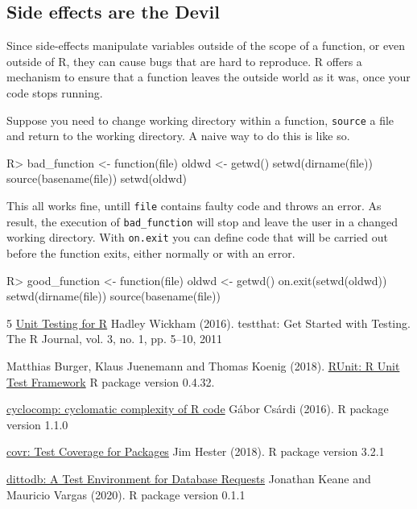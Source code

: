 \documentclass[11pt]{article}
\newcommand{\code}[1]{\texttt{#1}}
\let\oldmarginpar\marginpar
\renewcommand{\marginpar}[1]{\oldmarginpar{\color{bluetext}\raggedleft\scriptsize #1}}
\begin{document}
\subsection{Side effects are the Devil}
\label{sect:devil}
Since side-effects manipulate variables outside of the scope of a function, or
even outside of R, they can cause bugs that are hard to reproduce.  R offers a
mechanism to ensure that a function leaves the outside world as it was, once
your code stops running. 

Suppose you need to change working directory within a function, \code{source} a
file and return to the working directory. A naive way to do this is like so.
\marginpar{\code{on.exit}}
\begin{Schunk}
\begin{Sinput}
R> bad_function <- function(file){
     oldwd <- getwd()
     setwd(dirname(file))
     source(basename(file))
     setwd(oldwd)
   }
\end{Sinput}
\end{Schunk}
This all works fine, untill \code{file} contains faulty code and throws an
error.  As result, the execution of \code{bad\_function} will stop and leave
the user in a changed working directory. With \code{on.exit} you can define
code that will be carried out before the function exits, either normally
or with an error.
\begin{Schunk}
\begin{Sinput}
R> good_function <- function(file){
     oldwd <- getwd()
     on.exit(setwd(oldwd))
     setwd(dirname(file))
     source(basename(file))
   }
\end{Sinput}
\end{Schunk}




\newpage

\begin{thebibliography}{5}
    \href{https://cran.r-project.org/package=testthat}{Unit Testing for R}
    Hadley Wickham (2016). testthat: Get Started with Testing. The R Journal,
    vol. 3, no. 1, pp. 5--10, 2011

  Matthias Burger, Klaus Juenemann and Thomas Koenig (2018). 
  \href{https://CRAN.R-project.org/package=RUnit}{RUnit: R Unit Test Framework}
  R package version 0.4.32.



    \href{https://cran.r-project.org/package=cyclocomp}{cyclocomp: cyclomatic complexity of R code}
    G\'abor Cs\'ardi (2016).
    R package version 1.1.0

    \href{https://CRAN.R-project.org/package=covr}{covr: Test Coverage for Packages}
    Jim Hester (2018).
    R package version 3.2.1

    \href{https://CRAN.R-project.org/package=dittodb}{dittodb: A Test Environment for Database Requests}
    Jonathan Keane and Mauricio Vargas (2020).
    R package version 0.1.1

\end{thebibliography}
\end{document}
